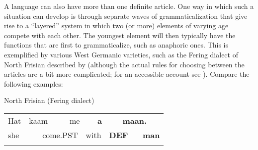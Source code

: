 \begin{styleBodytextC}
A language can also have more than one definite article. One way in which such a situation can develop is through separate waves of grammaticalization that give rise to a “layered” system in which two (or more) elements of varying age compete with each other. The youngest element will then typically have the functions that are first to grammaticalize, such as anaphoric ones. This is exemplified by various West Germanic varieties, such as the Fering dialect of North Frisian described by \citet{Ebert1971} (although the actual rules for choosing between the articles are a bit more complicated; for an accessible account see \citet[162]{Lyons1999}). Compare the following examples:

\end{styleBodytextC}

\begin{listWWNumileveli}
\item 

\begin{styleExample}
North Frisian (Fering dialect)

\end{styleExample}

\end{listWWNumileveli}

\begin{listWWNumxvleveli}
\item 

\end{listWWNumxvleveli}

\begin{tabular}{llllllllll}
\lsptoprule
Hat & \multicolumn{2}{l}{kaam

} & \multicolumn{2}{l}{me

} & \multicolumn{2}{l}{{\bfseries a}

} & \multicolumn{2}{l}{{\bfseries maan.}

} & \\
\multicolumn{2}{l}{she

} & \multicolumn{2}{l}{come.PST

} & \multicolumn{2}{l}{with

} & \multicolumn{2}{l}{{\bfseries DEF}

} & \multicolumn{2}{l}{{\bfseries man}

}\\
\lspbottomrule
\end{tabular}

